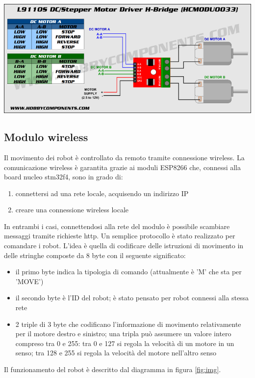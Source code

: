 \documentclass [11pt ,a4paper ,twoside ]{article}
\begin{document}
\begin{center}
\includegraphics[keepaspectratio, width=400pt]{Images/motor_driver_diagram.png}
\end{center}

\subsection{Modulo wireless} \label{communication}
Il movimento dei robot \`e controllato da remoto tramite connessione wireless. La comunicazione wireless \`e garantita grazie ai moduli ESP8266 che, connessi alla board nucleo stm32f4, sono in grado di:
\begin{enumerate}
	\item connettersi ad una rete locale, acquisendo un indirizzo IP
	\item creare una connessione wireless locale
\end{enumerate}
In entrambi i casi, connettendosi alla rete del modulo \`e possibile scambiare messaggi tramite richieste http. Un semplice protocollo \`e stato realizzato per comandare i robot. L'idea \`e quella di codificare delle istruzioni di movimento in delle stringhe composte da 8 byte con il seguente significato:
\begin{itemize}
	\item il primo byte indica la tipologia di comando (attualmente \`e 'M' che sta per 'MOVE')
	\item il secondo byte \`e l'ID del robot; \`e stato pensato per robot connessi alla stessa rete
	\item 2 triple di 3 byte che codificano l'informazione di movimento relativamente per il motore destro e sinistro; una tripla pu\`o assumere un valore intero compreso tra 0 e 255: tra 0 e 127 si regola la velocit\`a di un motore in un senso; tra 128 e 255 si regola la velocit\`a del motore nell'altro senso
\end{itemize}
Il funzionamento del robot \`e descritto dal diagramma in figura \ref{fig:img}.
\end{document}
